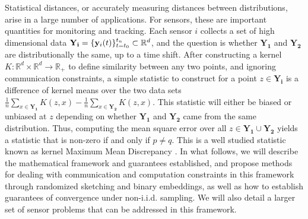 Statistical distances, or accurately measuring distances between distributions, arise in a large number of applications.  For sensors, these are important quantities for monitoring and tracking.
Each sensor $i$ collects a set of high dimensional data $\mathbf{Y_i}=\{\mathbf{y}_i(t)\}_{t=t_0}^{t_n}\subset \mathbb{R}^d$, and the question is whether $\mathbf{Y_1}$ and $\mathbf{Y_2}$ are distributionally the same, up to a time shift.  After constructing a kernel $K: \mathbb{R}^d\times \mathbb{R}^d \rightarrow \mathbb{R}_+$ to define similarity between any two points, and ignoring communication constraints, a simple statistic to construct for a point $z \in \mathbf{Y_i}$ is a difference of kernel means over the two data sets $\frac{1}{n}\sum_{x\in \mathbf{Y_1}} K(z,x) - \frac{1}{n}\sum_{x\in \mathbf{Y_2}} K(z,x)$.  This statistic will either be biased or unbiased at $z$ depending on whether $\mathbf{Y_1}$ and $\mathbf{Y_2}$ came from the same distribution. %
Thus, computing the mean square error over all $z\in \mathbf{Y_1}\cup \mathbf{Y_2}$ yields a statistic that is non-zero if and only if $p\neq q$.
This is a well studied statistic known as kernel Maximum Mean Discrepancy \cite{gretton2012kernel}.  In what follows, we will describe the mathematical framework and guarantees established, and propose methods for dealing with communication and computation constraints in this framework through randomized sketching and binary embeddings, as well as how to establish guarantees of convergence under non-i.i.d. sampling. %
 We will also detail a larger set of sensor problems that can be addressed in this framework.


